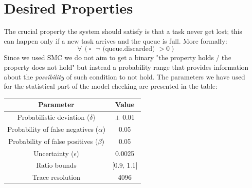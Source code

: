 \documentclass{article}
\begin{document}
	\section{Desired Properties}
		The crucial property the system should satisfy is that a task never get lost; this can happen only if a new task arrives and the queue is full. More formally:
		\begin{equation}
			\forall\, (\square \text{ $\neg$ (queue.discarded) } > 0)
		\end{equation}
		Since we used SMC we do not aim to get a binary "the property holds / the property does not hold" but instead a probability range that provides information about the \emph{possibility} of such condition to not hold. The parameters we have used for the statistical part of the model checking are presented in the table:
		\begin{center}
			\begin{tabular}{ | c | c |}
				\hline
				Parameter & Value \\
				\hline
				\hline
				Probabilistic deviation ($\delta$) & $\pm$ 0.01 \\
				\hline
				Probability of false negatives ($\alpha$) & 0.05 \\
				\hline
				Probability of false positives ($\beta$) & 0.05 \\
				\hline
				Uncertainty ($\epsilon$) & 0.0025 \\
				\hline
				Ratio bounds & [0.9, 1.1]\\
				\hline
				Trace resolution & 4096 \\
				\hline
			\end{tabular}
		\end{center}
\end{document}
